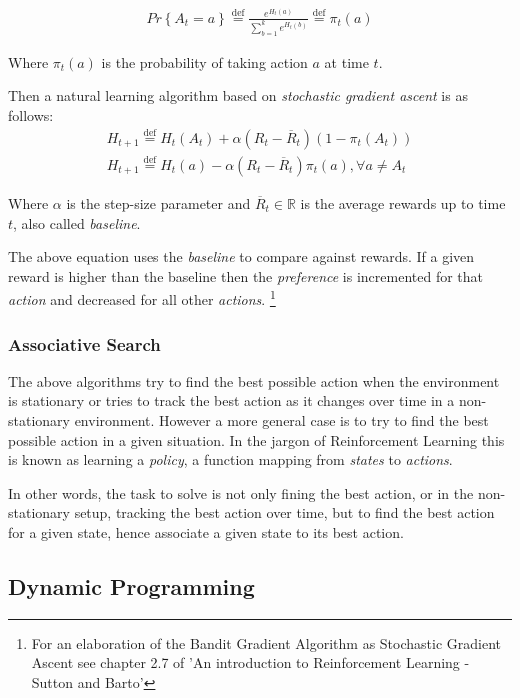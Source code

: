 \documentclass[paper=a4,fontsize=11pt]{scrartcl} %
\numberwithin{equation}{section} %
\numberwithin{figure}{section} %
\numberwithin{table}{section} %
\newcommand{\eqdef}{\stackrel{\text{def}}{=}}
\begin{document}
\begin{align}
Pr \left\lbrace A_t=a \right\rbrace \eqdef \frac{ e^{H_t(a)} }{ \sum_{b=1}^k e^{H_t(b)} } \eqdef \pi_t(a)
\end{align}

Where $ \pi_t(a) $ is the probability of taking action $a$ at time $t$.

Then a natural learning algorithm based on \textit{stochastic gradient ascent} is as follows:
\begin{equation}
	\begin{aligned}
		H_{t+1} \eqdef H_t(A_t) + \alpha (R_t - \overline{R}_t) (1 - \pi_t(A_t)) \\
        H_{t+1} \eqdef H_t(a) - \alpha (R_t - \overline{R}_t) \pi_t(a), 	
        \forall a \neq A_t
	\end{aligned}
\end{equation}

Where $\alpha$ is the step-size parameter and $\overline{R}_t \in \mathbb{R}$ is the average rewards up to time $t$, 
also called \textit{baseline}.

The above equation uses the \textit{baseline} to compare against rewards. If a given reward is higher than the
baseline then the \textit{preference} is incremented for that \textit{action} and decreased for all other \textit{actions}.
\footnote{For an elaboration of the Bandit Gradient Algorithm as Stochastic Gradient Ascent see chapter 2.7 of 'An introduction to Reinforcement Learning - Sutton and Barto'}

\subsubsection{Associative Search}
The above algorithms try to find the best possible action when the environment is stationary or tries to track the best
action as it changes over time in a non-stationary environment. However a more general case is to try to find the best possible
action in a given situation.
In the jargon of Reinforcement Learning this is known as learning a \textit{policy}, 
a function mapping from \textit{states} to \textit{actions}.

In other words, the task to solve is not only fining the best action, or in the
non-stationary setup, tracking the best action over time, but to find the
best action for a given state, hence associate a given state to its best action.

\subsection{Dynamic Programming}
\end{document}
